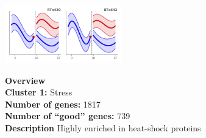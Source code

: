 \begin{multicols}{2}
\includegraphics[width=2in]{figures/clusters/root_Postflowering_0.png}
\columnbreak

\noindent \textbf{Overview}\\\textbf{Cluster 1:} Stress \\
\textbf{Number of genes:} 1817 \\
\textbf{Number of ``good'' genes:} 739 \\
\textbf{Description} Highly enriched in heat-shock proteins \\
\end{multicols}

